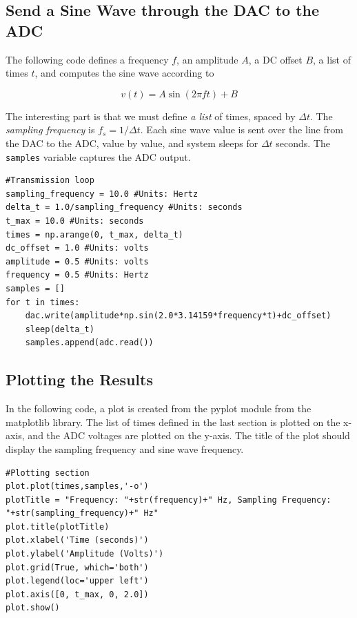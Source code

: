 \documentclass{article}
\begin{document}
\subsection{Send a Sine Wave through the DAC to the ADC}

The following code defines a frequency $f$, an amplitude $A$, a DC offset $B$, a list of times $t$, and computes the sine wave according to

\begin{equation}
v(t) = A\sin(2\pi ft) + B
\end{equation}

The interesting part is that we must define \textit{a list} of times, spaced by $\Delta t$.  The \textit{sampling frequency} is $f_s = 1/\Delta t$.  Each sine wave value is sent over the line from the DAC to the ADC, value by value, and system sleeps for $\Delta t$ seconds.  The \verb+samples+ variable captures the ADC output.

\begin{verbatim}
#Transmission loop
sampling_frequency = 10.0 #Units: Hertz
delta_t = 1.0/sampling_frequency #Units: seconds
t_max = 10.0 #Units: seconds
times = np.arange(0, t_max, delta_t)
dc_offset = 1.0 #Units: volts
amplitude = 0.5 #Units: volts
frequency = 0.5 #Units: Hertz
samples = []
for t in times:
    dac.write(amplitude*np.sin(2.0*3.14159*frequency*t)+dc_offset)
    sleep(delta_t)
    samples.append(adc.read())
\end{verbatim}

\subsection{Plotting the Results}

In the following code, a plot is created from the pyplot module from the matplotlib library.  The list of times defined in the last section is plotted on the x-axis, and the ADC voltages are plotted on the y-axis.  The title of the plot should display the sampling frequency and sine wave frequency.

\begin{verbatim}
#Plotting section
plot.plot(times,samples,'-o')
plotTitle = "Frequency: "+str(frequency)+" Hz, Sampling Frequency: "+str(sampling_frequency)+" Hz"
plot.title(plotTitle)
plot.xlabel('Time (seconds)')
plot.ylabel('Amplitude (Volts)')
plot.grid(True, which='both') 
plot.legend(loc='upper left')
plot.axis([0, t_max, 0, 2.0])
plot.show()
\end{verbatim}
\end{document}
